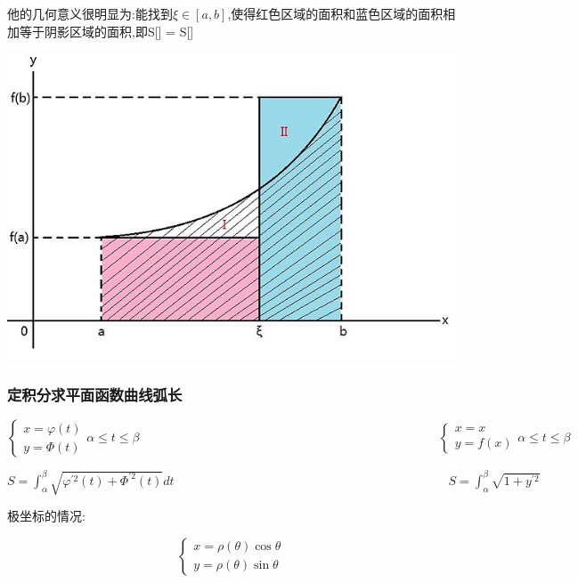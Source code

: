 \documentclass[UTF8,12pt]{ctexbook}
\newcommand{\defFunction}[1]{f(#1)}
\newcommand{\definiteIntegral}[2]{\int^{#1}_{#2}}
\begin{document}
{{{{他的几何意义很明显为:能找到$\xi\in[a,b]$,使得红色区域的面积和蓝色区域的面积相加等于阴影区域的面积,即S[\uppercase\expandafter{}] = S[\uppercase\expandafter{}]

\begin{center}
  \includegraphics{resources/Geometric_explanation_of_the_second_mean_value_theorem_for_integration.jpg}
\end{center}

}%

\subsubsection{定积分求平面函数曲线弧长}{

  $$
    \begin{cases}
      x = \varphi(t) \\
      y = \Phi(t)
    \end{cases}
    \alpha \leq t \leq \beta
    \qquad\qquad\qquad\qquad\qquad\qquad\qquad\qquad\qquad\qquad\qquad\qquad
    \begin{cases}
      x = x \\
      y = \defFunction{x}
    \end{cases}
    \alpha \leq t \leq \beta
  $$

  $S = \definiteIntegral{\beta}{\alpha}\sqrt{\varphi^{\prime 2}(t) + \Phi^{\prime 2}(t)}dt\qquad\qquad\qquad\qquad\qquad\qquad\qquad\qquad\qquad\qquad\qquad S = \definiteIntegral{\beta}{\alpha}\sqrt{1 + y^{\prime 2}}$

  极坐标的情况:

  $$
    \begin{cases}
      x = \rho(\theta)\cos\theta \\
      y = \rho(\theta)\sin\theta
    \end{cases}
  $$

}}}}
\end{document}

